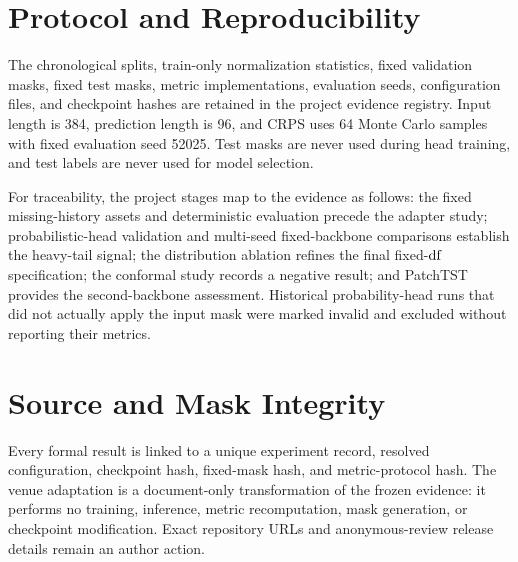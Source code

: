 \section{Protocol and Reproducibility}
\label{supp:protocol}
The chronological splits, train-only normalization statistics, fixed validation masks, fixed test masks, metric implementations, evaluation seeds, configuration files, and checkpoint hashes are retained in the project evidence registry. Input length is 384, prediction length is 96, and CRPS uses 64 Monte Carlo samples with fixed evaluation seed 52025. Test masks are never used during head training, and test labels are never used for model selection.

For traceability, the project stages map to the evidence as follows: the fixed missing-history assets and deterministic evaluation precede the adapter study; probabilistic-head validation and multi-seed fixed-backbone comparisons establish the heavy-tail signal; the distribution ablation refines the final fixed-$\mathrm{df}$ specification; the conformal study records a negative result; and PatchTST provides the second-backbone assessment. Historical probability-head runs that did not actually apply the input mask were marked invalid and excluded without reporting their metrics.

\section{Source and Mask Integrity}
\label{supp:integrity}
Every formal result is linked to a unique experiment record, resolved configuration, checkpoint hash, fixed-mask hash, and metric-protocol hash. The venue adaptation is a document-only transformation of the frozen evidence: it performs no training, inference, metric recomputation, mask generation, or checkpoint modification. Exact repository URLs and anonymous-review release details remain an author action.
